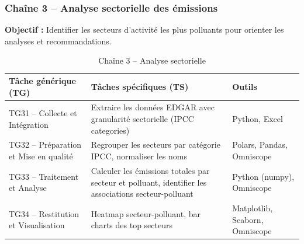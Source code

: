 \documentclass[11pt,a4paper]{article}
\begin{document}
\clearpage
\subsubsection{Chaîne 3 -- Analyse sectorielle des émissions}

\textbf{Objectif :} Identifier les secteurs d'activité les plus polluants pour orienter les analyses et recommandations.

\begin{table}[H]
\centering
\caption{Chaîne 3 -- Analyse sectorielle}
\begin{tabular}{p{3.5cm}p{5.5cm}p{4.5cm}}
\toprule
\textbf{Tâche générique (TG)} & \textbf{Tâches spécifiques (TS)} & \textbf{Outils} \\
\midrule
TG31 -- Collecte et Intégration & Extraire les données EDGAR avec granularité sectorielle (IPCC categories) & Python, Excel \\
\midrule
TG32 -- Préparation et Mise en qualité & Regrouper les secteurs par catégorie IPCC, normaliser les noms & Polars, Pandas, Omniscope \\
\midrule
TG33 -- Traitement et Analyse & Calculer les émissions totales par secteur et polluant, identifier les associations secteur-polluant & Python (numpy), Omniscope \\
\midrule
TG34 -- Restitution et Visualisation & Heatmap secteur-polluant, bar charts des top secteurs & Matplotlib, Seaborn, Omniscope \\
\bottomrule
\end{tabular}
\end{table}
\end{document}
